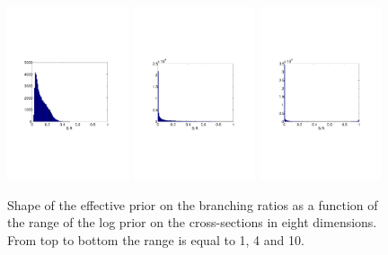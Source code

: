 \documentclass{article}
\begin{document}
\begin{figure}
\centering
\includegraphics[trim = 70 230 100 230, clip = true, width=0.32\textwidth]{figs/BR_Prior_CS_Range1}
\includegraphics[trim = 80 230 100 230, clip = true, width=0.32\textwidth]{figs/BR_Prior_CS_Range4}
\includegraphics[trim = 80 230 100 230, clip = true, width=0.32\textwidth]{figs/BR_Prior_CS_Range10}
\caption{Shape of the effective prior on the branching ratios as a function of the range of the log prior on the cross-sections in eight dimensions. From top to bottom the range is equal to 1, 4 and 10.}
\label{BRPriorShape}
\end{figure}
\end{document}
